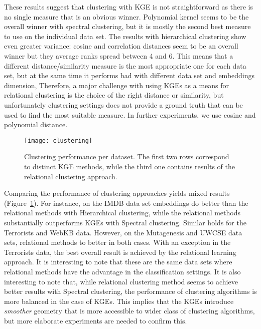 These results suggest that clustering with KGE is not straightforward as there is no single measure that is an obvious winner.
Polynomial kernel seems to be the overall winner with spectral clustering, but it is mostly the second best measure to use on the individual data set.
The results with hierarchical clustering show even greater variance: cosine and correlation distances seem to be an overall winner but they average ranks spread between 4 and 6.
This means that a different distance/similarity measure is the most appropriate one for each data set, but at the same time it performs bad with different data set and embeddings dimension,
Therefore, a major challenge with using KGEs as a means for relational clustering is the choice of the right distance or similarity, but unfortunately clustering settings does not provide a ground truth that can be used to find the most suitable measure.
In further experiments, we use cosine and polynomial distance.


\begin{figure}
	\centering
	\texttt{[image: clustering]}
	\caption{Clustering performance per dataset. The first two rows correspond to distinct KGE methods, while the third one contains results of the relational clustering approach.  }
	\label{fig:clustering}
\end{figure}


Comparing the performance of clustering approaches yields mixed results (Figure~\ref{fig:clustering}).
For instance, on the IMDB data set embeddings do better than the relational methods with Hierarchical clustering, while the relational methods substantially outperforms KGEs with Spectral clustering.
Similar holds for the Terrorists and WebKB data.
However, on the Mutagenesis and UWCSE data sets, relational methods to better in both cases.
With an exception in the Terrorists data, the best overall result is achieved by the relational learning approach.
It is interesting to note that these are the same data sets where relational methods have the advantage in the classification settings.
It is also interesting to note that, while relational clustering method seems to achieve better results with Spectral clustering, the performance of clustering algorithms is more balanced in the case of KGEs.
This implies that the KGEs introduce \textit{smoother} geometry that is more accessible to wider class of clustering algorithms, but more elaborate experiments are needed to confirm this.






